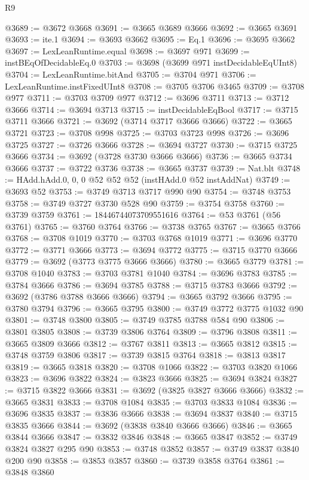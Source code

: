\begin{lexlean}{R9}
\begin{coremodule}
@3689 := @3672 @3668
@3691 := @3665 @3689 @3666
@3692 := @3665 @3691
@3693 := ite.{1}
@3694 := @3693 @3662
@3695 := Eq.{1}
@3696 := @3695 @3662
@3697 := LexLeanRuntime.equal
@3698 := @3697 @971
@3699 := instBEqOfDecidableEq.{0}
@3703 := @3698 (@3699 @971 instDecidableEqUInt8)
@3704 := LexLeanRuntime.bitAnd
@3705 := @3704 @971
@3706 := LexLeanRuntime.instFixedUInt8
@3708 := @3705 @3706 @3465
@3709 := @3708 @977
@3711 := @3703 @3709 @977
@3712 := @3696 @3711
@3713 := @3712 @3666
@3714 := @3694 @3713
@3715 := instDecidableEqBool
@3717 := @3715 @3711 @3666
@3721 := @3692 (@3714 @3717 @3666 @3666)
@3722 := @3665 @3721
@3723 := @3708 @998
@3725 := @3703 @3723 @998
@3726 := @3696 @3725
@3727 := @3726 @3666
@3728 := @3694 @3727
@3730 := @3715 @3725 @3666
@3734 := @3692 (@3728 @3730 @3666 @3666)
@3736 := @3665 @3734 @3666
@3737 := @3722 @3736
@3738 := @3665 @3737
@3739 := Nat.blt
@3748 := HAdd.hAdd.{0, 0, 0} @52 @52 @52 (instHAdd.{0} @52 instAddNat)
@3749 := @3693 @52
@3753 := @3749 @3713 @3717 @990 @90
@3754 := @3748 @3753
@3758 := @3749 @3727 @3730 @528 @90
@3759 := @3754 @3758
@3760 := @3739 @3759
@3761 := 18446744073709551616
@3764 := @53 @3761 (@56 @3761)
@3765 := @3760 @3764
@3766 := @3738 @3765
@3767 := @3665 @3766
@3768 := @3708 @1019
@3770 := @3703 @3768 @1019
@3771 := @3696 @3770
@3772 := @3771 @3666
@3773 := @3694 @3772
@3775 := @3715 @3770 @3666
@3779 := @3692 (@3773 @3775 @3666 @3666)
@3780 := @3665 @3779
@3781 := @3708 @1040
@3783 := @3703 @3781 @1040
@3784 := @3696 @3783
@3785 := @3784 @3666
@3786 := @3694 @3785
@3788 := @3715 @3783 @3666
@3792 := @3692 (@3786 @3788 @3666 @3666)
@3794 := @3665 @3792 @3666
@3795 := @3780 @3794
@3796 := @3665 @3795
@3800 := @3749 @3772 @3775 @1032 @90
@3801 := @3748 @3800
@3805 := @3749 @3785 @3788 @584 @90
@3806 := @3801 @3805
@3808 := @3739 @3806 @3764
@3809 := @3796 @3808
@3811 := @3665 @3809 @3666
@3812 := @3767 @3811
@3813 := @3665 @3812
@3815 := @3748 @3759 @3806
@3817 := @3739 @3815 @3764
@3818 := @3813 @3817
@3819 := @3665 @3818
@3820 := @3708 @1066
@3822 := @3703 @3820 @1066
@3823 := @3696 @3822
@3824 := @3823 @3666
@3825 := @3694 @3824
@3827 := @3715 @3822 @3666
@3831 := @3692 (@3825 @3827 @3666 @3666)
@3832 := @3665 @3831
@3833 := @3708 @1084
@3835 := @3703 @3833 @1084
@3836 := @3696 @3835
@3837 := @3836 @3666
@3838 := @3694 @3837
@3840 := @3715 @3835 @3666
@3844 := @3692 (@3838 @3840 @3666 @3666)
@3846 := @3665 @3844 @3666
@3847 := @3832 @3846
@3848 := @3665 @3847
@3852 := @3749 @3824 @3827 @295 @90
@3853 := @3748 @3852
@3857 := @3749 @3837 @3840 @200 @90
@3858 := @3853 @3857
@3860 := @3739 @3858 @3764
@3861 := @3848 @3860

\end{coremodule}
\end{lexlean}
